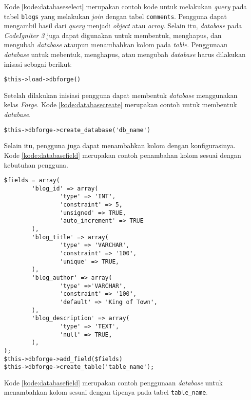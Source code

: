 Kode \ref{kode:databaseselect} merupakan contoh kode untuk melakukan \textit{query} pada tabel \texttt{blogs} yang melakukan \textit{join} dengan tabel \texttt{comments}. Pengguna dapat mengambil hasil dari \textit{query} menjadi \textit{object} atau \textit{array}. Selain itu, \textit{database} pada \textit{CodeIgniter 3} juga dapat digunakan untuk membentuk, menghapus, dan mengubah \textit{database} ataupun menambahkan kolom pada \textit{table}. Penggunaan \textit{database} untuk mebentuk, menghapus, atau mengubah \textit{database} harus dilakukan inisasi sebagai berikut:
\begin{center}
\verb|$this->load->dbforge()|
\end{center}
Setelah dilakukan inisiasi pengguna dapat membentuk \textit{database} menggunakan kelas \textit{Forge}. Kode \ref{kode:databasecreate} merupakan contoh untuk membentuk \textit{database}.

\begin{lstlisting}[caption=Contoh membentuk \textit{database} menggunakan \textit{CodeIgniter3} , label=kode:databasecreate]
	$this->dbforge->create_database('db_name')
\end{lstlisting}

Selain itu, pengguna juga dapat menambahkan kolom dengan konfigurasinya. Kode \ref{kode:databasefield} merupakan contoh penambahan kolom sesuai dengan kebutuhan pengguna.

\begin{lstlisting}[caption=Contoh menambahkan kolom dengan konfigurasinya menggunakan \textit{CodeIgniter3} , label=kode:databasefield]
	$fields = array(
        'blog_id' => array(
                'type' => 'INT',
                'constraint' => 5,
                'unsigned' => TRUE,
                'auto_increment' => TRUE
        ),
        'blog_title' => array(
                'type' => 'VARCHAR',
                'constraint' => '100',
                'unique' => TRUE,
        ),
        'blog_author' => array(
                'type' =>'VARCHAR',
                'constraint' => '100',
                'default' => 'King of Town',
        ),
        'blog_description' => array(
                'type' => 'TEXT',
                'null' => TRUE,
        ),
);
$this->dbforge->add_field($fields)
$this->dbforge->create_table('table_name');
\end{lstlisting}
Kode \ref{kode:databasefield} merupakan contoh penggunaan \textit{database} untuk menambahkan kolom sesuai dengan tipenya pada tabel \texttt{table\_name}.

